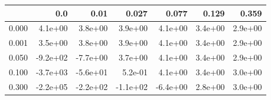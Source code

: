 \begin{tabular}{lrrrrrr}
\toprule
{} &      0.0 &     0.01 &    0.027 &    0.077 &   0.129 &   0.359 \\
\midrule
0.000 &  4.1e+00 &  3.8e+00 &  3.9e+00 &  4.1e+00 & 3.4e+00 & 2.9e+00 \\
0.001 &  3.5e+00 &  3.8e+00 &  3.9e+00 &  4.1e+00 & 3.4e+00 & 2.9e+00 \\
0.050 & -9.2e+02 & -7.7e+00 &  3.7e+00 &  4.1e+00 & 3.4e+00 & 2.9e+00 \\
0.100 & -3.7e+03 & -5.6e+01 &  5.2e-01 &  4.1e+00 & 3.4e+00 & 3.0e+00 \\
0.300 & -2.2e+05 & -2.2e+02 & -1.1e+02 & -6.4e+00 & 2.8e+00 & 3.0e+00 \\
\bottomrule
\end{tabular}
